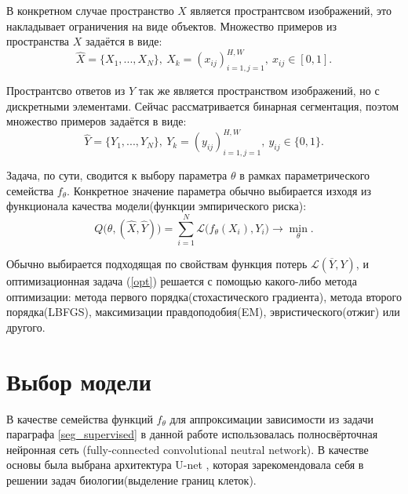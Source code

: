 \documentclass[12pt, a4paper]{extarticle}
\begin{document}
В конкретном случае пространство $X$ является пространтсвом изображений, это накладывает ограничения на виде объектов. Множество примеров из пространства $X$ задаётся в виде:
\begin{equation}
	\hat{X} = \{ X_1, ..., X_N \},\ X_k = (x_{ij})_{i=1, j=1}^{H, W}
                       	   ,\ x_{ij} \in [0, 1].
\end{equation}

Пространтсво ответов из $Y$ так же является пространством изображений, но с дискретными элементами. Сейчас рассматривается бинарная сегментация, поэтом множество примеров задаётся в виде:
\begin{equation}
	\hat{Y} = \{ Y_1, ... , Y_N \},\ Y_k = (y_{ij})_{i=1, j=1}^{H, W}
							,\ y_{ij} \in \{ 0, 1 \}.
\end{equation} 

Задача, по сути, сводится к выбору параметра $\theta$ в рамках  параметрического семейства $f_\theta$.
Конкретное значение параметра обычно выбирается изходя из функционала качества модели(функции эмпирического риска):
\begin{equation}\label{opt}
	Q \bigl( \theta, (\hat{X}, \hat{Y}) \bigr) = 
		\sum \limits_{i=1}^{N} \mathcal{L} 
		\bigl( f_{\theta}(X_i), Y_i \bigr)
		\longrightarrow \min \limits_{\theta}.
\end{equation}

Обычно выбирается подходящая по свойствам функция потерь $\mathcal{L}(\overline{Y}, Y)$, и оптимизационная задача (\ref{opt})
решается с помощью какого-либо метода оптимизации: метода первого порядка(стохастического градиента), метода второго порядка(LBFGS), максимизации правдоподобия(EM), эвристического(отжиг) или другого.

\newpage


\section{Выбор модели} \label{seg_nn}

В качестве семейства функций $f_{\theta}$ для аппроксимации зависимости из задачи параграфа \ref{seg_supervised} в данной работе использовалась 
полносвёрточная нейронная сеть (fully-connected convolutional neutral network). В качестве основы была выбрана архитектура U-net \cite{6}, которая зарекомендовала себя в решении задач биологии(выделение границ клеток). 
\end{document}
